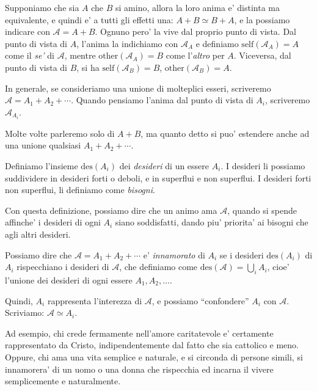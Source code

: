 \def\self{\textrm{self}}
\def\other{\textrm{other}}

Supponiamo che sia $A$ che $B$ si amino, allora la loro anima e' distinta ma equivalente, e quindi e' a tutti gli effetti una: $A+B \simeq B+A$, e la possiamo indicare con $\mathcal{A}=A+B$. Ognuno pero' la vive dal proprio punto di vista. Dal punto di vista di $A$, l'anima la indichiamo con $\mathcal{A}_A$ e definiamo $\textrm{self}(\mathcal{A}_A)=A$ come il \emph{se'} di $\mathcal{A}$, mentre $\textrm{other}(\mathcal{A}_A)=B$ come l'\emph{altro} per $A$. Viceversa, dal punto di vista di $B$, si ha $\textrm{self}(\mathcal{A}_B)=B$, $\textrm{other}(\mathcal{A}_B)=A$.

In generale, se consideriamo una unione di molteplici esseri, scriveremo $\mathcal{A}=A_1+A_2+\cdots$. Quando pensiamo l'anima dal punto di vista di $A_i$, scriveremo $\mathcal{A}_{A_i}$.

Molte volte parleremo solo di $A+B$, ma quanto detto si puo' estendere anche ad una unione qualsiasi $A_1+A_2+\cdots$. \\

\def\des{\textrm{des}}

Definiamo l'insieme $\des(A_i)$ dei \emph{desideri} di un essere $A_i$. I desideri li possiamo suddividere in desideri forti o deboli, e in superflui e non superflui. I desideri forti non superflui, li definiamo come \emph{bisogni}.

\def\anima#1{\mathcal{#1}}

Con questa definizione, possiamo dire che un animo ama $\anima{A}$, quando si spende affinche' i desideri di ogni $A_i$ siano soddisfatti, dando piu' priorita' ai bisogni che agli altri desideri. 

Possiamo dire che $\anima{A}=A_1+A_2+\cdots$ e' \emph{innamorato} di $A_i$ se i desideri $\des(A_i)$ di $A_i$ rispecchiano i desideri di $\anima{A}$, che definiamo come $\des(\anima{A})=\bigcup_i A_i$, cioe' l'unione dei desideri di ogni essere $A_1,A_2,\ldots$. 

Quindi, $A_i$ rappresenta l'interezza di $\anima{A}$, e possiamo ``confondere'' $A_i$ con $\anima{A}$. Scriviamo: $\anima{A} \simeq A_i$.

Ad esempio, chi crede fermamente nell'amore caritatevole e' certamente rappresentato da Cristo, indipendentemente dal fatto che sia cattolico e meno. Oppure, chi ama una vita semplice e naturale, e si circonda di persone simili, si innamorera' di un uomo o una donna che rispecchia ed incarna il vivere semplicemente e naturalmente.
\\

